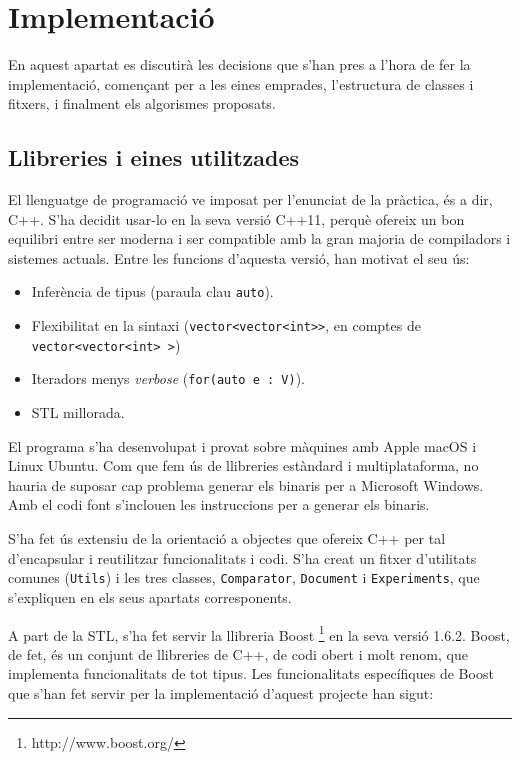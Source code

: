 \documentclass[catalan, 12pt]{report}
\begin{document}
\chapter{Implementació}

En aquest apartat es discutirà les decisions que s'han pres a l'hora de fer la implementació, començant per a les eines emprades, l'estructura de classes i fitxers, i finalment els algorismes proposats.

\section{Llibreries i eines utilitzades}

El llenguatge de programació ve imposat per l'enunciat de la pràctica, és a dir, C++. S'ha decidit usar-lo en la seva versió C++11, perquè ofereix un bon equilibri entre ser moderna i ser compatible amb la gran majoria de compiladors i sistemes actuals. Entre les funcions d'aquesta versió, han motivat el seu ús:

\begin{itemize}
\item Inferència de tipus (paraula clau \verb|auto|).
\item Flexibilitat en la sintaxi (\verb|vector<vector<int>>|, en comptes de \verb|vector<vector<int> >|)
\item Iteradors menys \textit{verbose} (\verb|for(auto e : V)|).
\item STL millorada.
\end{itemize}

El programa s'ha desenvolupat i provat sobre màquines amb Apple macOS i Linux Ubuntu. Com que fem ús de llibreries estàndard i multiplataforma, no hauria de suposar cap problema generar els binaris per a Microsoft Windows. Amb el codi font s'inclouen les instruccions per a generar els binaris.\newline

S'ha fet ús extensiu de la orientació a objectes que ofereix C++ per tal d'encapsular i reutilitzar funcionalitats i codi. S'ha creat un fitxer d'utilitats comunes (\verb|Utils|) i les tres classes, \verb|Comparator|, \verb|Document| i \verb|Experiments|, que s'expliquen en els seus apartats corresponents.\newline

A part de la STL, s'ha fet servir la llibreria Boost \footnote{http://www.boost.org/} en la seva versió 1.6.2. Boost, de fet, és un conjunt de llibreries de C++, de codi obert i molt renom, que implementa funcionalitats de tot tipus. Les funcionalitats específiques de Boost que s'han fet servir per la implementació d'aquest projecte han sigut:
\end{document}
